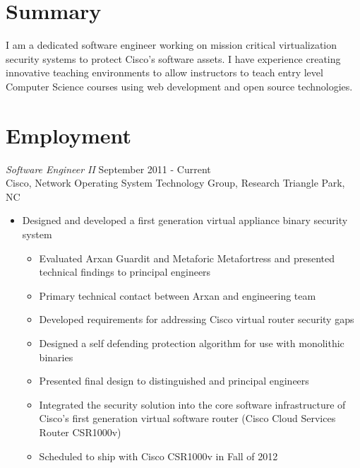 \documentclass[line,margin]{res}
\begin{document}
\address{500 North Duke Street Durham, NC 27701}
\address{Email: vtwoods@gmail.com --- Cell: (703)475-1337}

 
\begin{resume}

\section{Summary} I am a dedicated software engineer working on mission critical virtualization security systems to protect Cisco's software assets.  I have experience creating innovative teaching environments to allow instructors to teach entry level Computer Science courses using web development and open source technologies.

\section{Employment}
        {\sl Software Engineer II} \hfill September 2011 - Current \\
        Cisco, Network Operating System Technology Group, Research Triangle Park, NC
        \begin{itemize}  \itemsep -2pt %
          \item Designed and developed a first generation virtual appliance binary security system
            \begin{itemize} \itemsep -2pt %
                \item Evaluated Arxan Guardit and Metaforic Metafortress and presented technical findings to principal engineers
                \item Primary technical contact between Arxan and engineering team
                \item Developed requirements for addressing Cisco virtual router security gaps
                \item Designed a self defending protection algorithm for use with monolithic binaries
                \item Presented final design to distinguished and principal engineers
                \item Integrated the security solution into the core software infrastructure of Cisco's first generation virtual software router (Cisco Cloud Services Router CSR1000v)
                \item Scheduled to ship with Cisco CSR1000v in Fall of 2012

\end{itemize}
\end{itemize}
\end{resume}
\end{document}
